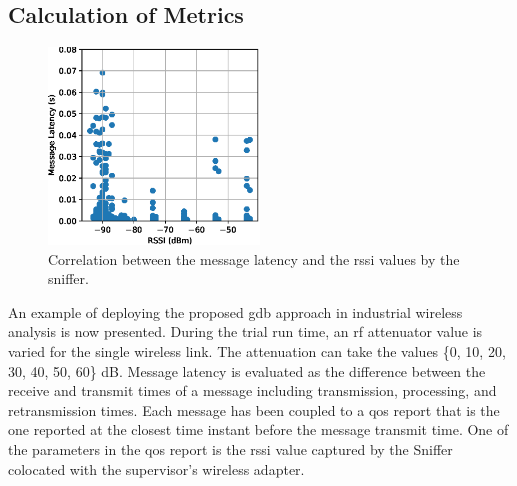 \subsection{Calculation of Metrics}

\begin{figure}[!ht]
	\centering
	\includegraphics[width=0.5\textwidth]{./chapter-gdb-appl/figures/database/scatter_1.eps}
	\caption{Correlation between the message latency and the \gls{rssi} values by the sniffer.}
	\label{gdbappl:fig::database:scatter}
\end{figure}

An example of deploying the proposed \gls{gdb} approach in industrial wireless analysis is now presented. During the trial run time, an \gls{rf} attenuator value is varied for the single wireless link. The attenuation can take the values \{0, 10, 20, 30, 40, 50, 60\} dB. Message latency is evaluated as the difference between the receive and transmit times of a message including transmission, processing, and retransmission times. Each message has been coupled to a \gls{qos} report that is the one reported at the closest time instant before the message transmit time. One of the parameters in the \gls{qos} report is the \gls{rssi} value captured by the Sniffer colocated with the supervisor's wireless adapter. 

